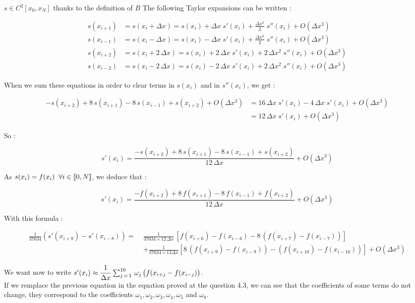 \documentclass[10pt]{article}
\begin{document}
$s \in C^2[x_0,x_N]$ thanks to the definition of $B$
The following Taylor expansions can be written :

\begin{align*}
 s(x_{i+1}) &= s(x_i + \Delta x) = s(x_i) + \Delta x \; s'(x_i) + \frac{\Delta x^2}{2}\; s''(x_i) + O(\Delta x^3) \\
 s(x_{i-1}) &= s(x_i - \Delta x) = s(x_i) - \Delta x \; s'(x_i) + \frac{\Delta x^2}{2}\; s''(x_i) + O(\Delta x^3) \\
 s(x_{i+2}) &= s(x_i + 2\,\Delta x) = s(x_i) + 2\,\Delta x\; s'(x_i) + 2\,\Delta x^2\;s''(x_i) + O(\Delta x^3) \\
 s(x_{i-2}) &= s(x_i - 2\,\Delta x) = s(x_i) - 2\,\Delta x \;s'(x_i) + 2\,\Delta x^2\;s''(x_i) + O(\Delta x^3)
\end{align*}

When we sum these equations in order to clear terms in $s(x_i)$ and in $s''(x_i)$, we get :

\begin{align*}
-s(x_{i+2}) + 8\,s(x_{i+1}) - 8\,s(x_{i-1}) + s(x_{i+2}) + O(\Delta x^3)&= 16\, \Delta x \;  s'(x_i) - 4\, \Delta x \; s'(x_i)+ O(\Delta x^3) \\&= 12\, \Delta x \;  s'(x_i)+ O(\Delta x^3)
\end{align*}

So :

$$ s'(x_i) = \frac{-s(x_{i+2}) + 8\,s(x_{i+1}) - 8\,s(x_{i-1}) + s(x_{i+2})}{12\, \Delta x} + O(\Delta x^3)$$

As $s(x_i) = f(x_i) \;\; \forall i \in\mbox{\textlbrackdbl} 0,N\mbox{\textrbrackdbl}$, we deduce that :

$$\boxed{s'(x_i) = \frac{-f(x_{i+2}) + 8\,f(x_{i+1}) - 8\,f(x_{i-1}) + f(x_{i+2})}{12\, \Delta x} + O(\Delta x^3)}$$


With this formula :

\begin{align*}
\frac{1}{37634} \left( s'(x_{i+8}) -s'(x_{i-8}) \right) = \; & \frac{1}{37634 \times 12 \,\Delta x}\, \left[ f(x_{i+6})-f(x_{i-6}) - 8\,(f(x_{i+7}) - f(x_{i-7}))\right] \\
& + \frac{1}{37634 \times 12 \Delta x} \left[8\,(f(x_{i+9})-f(x_{i-9})) -  (f(x_{i+10})- f(x_{i-10})) \right]+ O(\Delta x^3)
\end{align*}

We want now to write $s'(x_{i}) \approx \cfrac{1}{\Delta x}\, \sum_{j\,=\,1}^{10} \, \omega_{j}\,\big(f(x_{i+j}-f(x_{i-j})\big)$. \\
If we remplace the previous equation in the equation proved at the question 4.3, we can see that the coefficients of some terms do not change, they correspond to the coefficients $\omega_1 , \omega_2, \omega_3, \omega_4, \omega_5$ and $\omega_8$. \\
\end{document}
